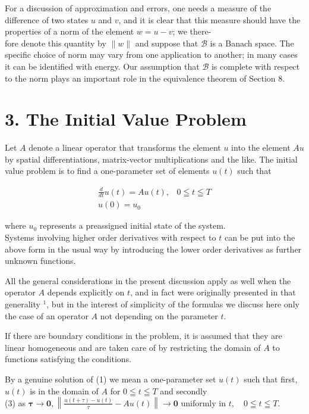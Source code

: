 \documentclass[10pt]{article}
\begin{document}
For a discussion of approximation and errors, one needs a measure of the difference of two states \(u\) and \(v\), and it is clear that this measure should have the properties of a norm of the element \(w=u-v\); we there-\\
fore denote this quantity by \(\|w\|\) and suppose that \(\mathscr{B}\) is a Banach space. The specific choice of norm may vary from one application to another; in many cases it can be identified with energy. Our assumption that \(\mathscr{B}\) is complete with respect to the norm plays an important role in the equivalence theorem of Section 8.

\section*{3. The Initial Value Problem}
Let \(A\) denote a linear operator that transforms the element \(u\) into the element \(A u\) by spatial differentiations, matrix-vector multiplications and the like. The initial value problem is to find a one-parameter set of elements \(u(t)\) such that

\[
\begin{array}{ll}
\frac{d}{d t} u(t)=A u(t), & 0 \leqq t \leqq T \\
u(0)=u_{0} &
\end{array}
\]

where \(u_{0}\) represents a preassigned initial state of the system.\\
Systems involving higher order derivatives with respect to \(t\) can be put into the above form in the usual way by introducing the lower order derivatives as further unknown functions.

All the general considerations in the present discussion apply as well when the operator \(A\) depends explicitly on \(t\), and in fact were originally presented in that generality \({ }^{1}\), but in the interest of simplicity of the formulas we discuss here only the case of an operator \(A\) not depending on the parameter \(t\).

If there are boundary conditions in the problem, it is assumed that they are linear homogeneous and are taken care of by restricting the domain of \(A\) to functions satisfying the conditions.

By a genuine solution of (1) we mean a one-parameter set \(u(t)\) such that first, \(u(t)\) is in the domain of \(A\) for \(0 \leqq t \leqq T\) and secondly\\
(3) as \(\boldsymbol{\tau} \rightarrow \mathbf{0},\left\|\frac{u(t+\tau)-u(t)}{\tau}-A u(t)\right\| \rightarrow \mathbf{0}\) uniformly in \(t, \quad 0 \leqq t \leqq T\).
\end{document}

